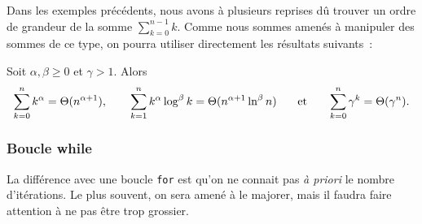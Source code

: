 \documentclass{magnolia}
\begin{document}
Dans les exemples précédents, nous avons à plusieurs reprises dû trouver un ordre
de grandeur de la somme $\sum_{k=0}^{n-1} k$. Comme nous sommes amenés à 
manipuler des sommes de ce type, on pourra utiliser directement les résultats suivants~:


\begin{proposition}
  Soit $\alpha,\beta\geq 0$ et $\gamma>1$. Alors
\[\sum_{k=0}^n k^\alpha = \Theta(n^{\alpha+1}), \qquad
  \sum_{k=1}^n k^\alpha \log^\beta k  = \Theta(n^{\alpha+1}\ln^\beta n)
  \quad\quad\!\text{et}\quad\!\quad \sum_{k=0}^n \gamma^k = \Theta(\gamma^n).\]
\end{proposition}

\subsubsection{Boucle while}

La différence avec une boucle \verb!for! est qu'on ne connait pas
\emph{à priori} le nombre d'itérations. Le plus souvent, on sera amené
à le majorer, mais il faudra faire attention à ne pas être trop grossier.\\


\end{document}
